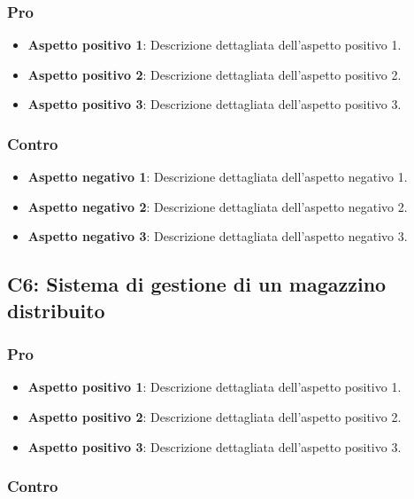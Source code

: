 \subsubsection{Pro}

\begin{itemize}
    \item \textbf{Aspetto positivo 1}: Descrizione dettagliata dell'aspetto positivo 1.
    \item \textbf{Aspetto positivo 2}: Descrizione dettagliata dell'aspetto positivo 2.
    \item \textbf{Aspetto positivo 3}: Descrizione dettagliata dell'aspetto positivo 3.
\end{itemize}

\subsubsection{Contro}

\begin{itemize}
    \item \textbf{Aspetto negativo 1}: Descrizione dettagliata dell'aspetto negativo 1.
    \item \textbf{Aspetto negativo 2}: Descrizione dettagliata dell'aspetto negativo 2.
    \item \textbf{Aspetto negativo 3}: Descrizione dettagliata dell'aspetto negativo 3.
\end{itemize}


\subsection{C6: Sistema di gestione di un magazzino distribuito}

\subsubsection{Pro}

\begin{itemize}
    \item \textbf{Aspetto positivo 1}: Descrizione dettagliata dell'aspetto positivo 1.
    \item \textbf{Aspetto positivo 2}: Descrizione dettagliata dell'aspetto positivo 2.
    \item \textbf{Aspetto positivo 3}: Descrizione dettagliata dell'aspetto positivo 3.
\end{itemize}

\subsubsection{Contro}


